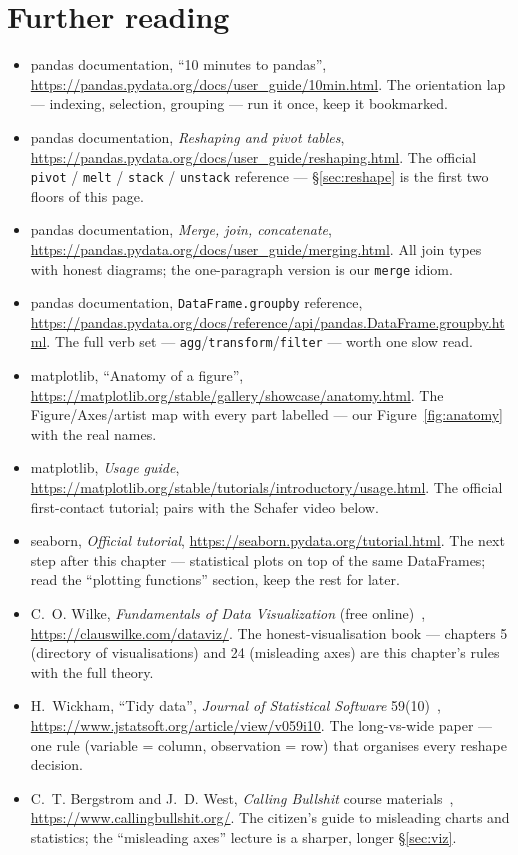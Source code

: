 \section*{Further reading}

\begin{itemize}
\item pandas documentation, ``10 minutes to pandas'',
  \url{https://pandas.pydata.org/docs/user_guide/10min.html}. The
  orientation lap --- indexing, selection, grouping --- run it once, keep it
  bookmarked.
\item pandas documentation, \emph{Reshaping and pivot tables},
  \url{https://pandas.pydata.org/docs/user_guide/reshaping.html}. The
  official \texttt{pivot} / \texttt{melt} / \texttt{stack} /
  \texttt{unstack} reference --- \S\ref{sec:reshape} is the first two
  floors of this page.
\item pandas documentation, \emph{Merge, join, concatenate},
  \url{https://pandas.pydata.org/docs/user_guide/merging.html}. All join
  types with honest diagrams; the one-paragraph version is our
  \texttt{merge} idiom.
\item pandas documentation, \texttt{DataFrame.groupby} reference,
  \url{https://pandas.pydata.org/docs/reference/api/pandas.DataFrame.groupby.html}.
  The full verb set --- \texttt{agg}/\texttt{transform}/\texttt{filter} ---
  worth one slow read.
\item matplotlib, ``Anatomy of a figure'',
  \url{https://matplotlib.org/stable/gallery/showcase/anatomy.html}. The
  Figure/Axes/artist map with every part labelled --- our
  Figure~\ref{fig:anatomy} with the real names.
\item matplotlib, \emph{Usage guide},
  \url{https://matplotlib.org/stable/tutorials/introductory/usage.html}.
  The official first-contact tutorial; pairs with the Schafer video below.
\item seaborn, \emph{Official tutorial},
  \url{https://seaborn.pydata.org/tutorial.html}. The next step after this
  chapter --- statistical plots on top of the same DataFrames; read the
  ``plotting functions'' section, keep the rest for later.
\item C.~O. Wilke, \emph{Fundamentals of Data Visualization}
  (free online)~\cite{wilke2019},
  \url{https://clauswilke.com/dataviz/}. The honest-visualisation book ---
  chapters 5 (directory of visualisations) and 24 (misleading axes) are this
  chapter's rules with the full theory.
\item H.~Wickham, ``Tidy data'', \emph{Journal of Statistical Software}
  59(10)~\cite{wickham2014},
  \url{https://www.jstatsoft.org/article/view/v059i10}. The long-vs-wide
  paper --- one rule (variable = column, observation = row) that organises
  every reshape decision.
\item C.~T. Bergstrom and J.~D. West, \emph{Calling Bullshit} course
  materials~\cite{callingbullshit},
  \url{https://www.callingbullshit.org/}. The citizen's guide to misleading
  charts and statistics; the ``misleading axes'' lecture is a sharper,
  longer \S\ref{sec:viz}.
\end{itemize}


